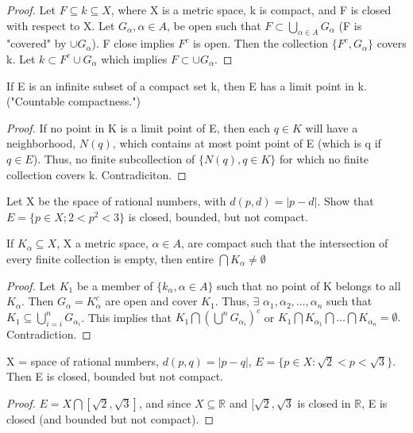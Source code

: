 \documentclass[11pt,fleqn]{book} %
\begin{document}
\begin{proof}
	Let $F \subseteq k \subseteq X$, where X is a metric space, k is compact, and F is closed with respect to X. Let $G_\alpha, \alpha \in A$, be open such that $F \subset \bigcup\limits_{\alpha \in A} G_\alpha$ (F is "covered" by $\cup G_\alpha$). F close implies $F^c$ is open. Then the collection $\{F^c, G_\alpha\}$ covers k. Let $k \subset F^c \cup G_\alpha$ which implies $F \subset \cup G_\alpha$. 
\end{proof}

\begin{theorem}
	If E is an infinite subset of a compact set k, then E has a limit point in k. ("Countable compactness.")
\end{theorem}

\begin{proof}
	If no point in K is a limit point of E, then each $q \in K$ will have a neighborhood, $N(q)$, which contains at most point point of E (which is q if $q \in E$). Thus, no finite subcollection of $\{N(q), q \in K \}$ for which no finite collection covers k. Contradiciton. 
\end{proof}

\begin{example}
	Let X be the space of rational numbers, with $d(p,d) = |p-d|$. Show that $E=\{p\in X; 2<p^2<3\}$ is closed, bounded, but not compact.
\end{example}

\begin{theorem}
	If $K_\alpha \subseteq X$, X a metric space, $\alpha \in A$, are compact such that the intersection of every finite collection is empty, then entire $\bigcap K_\alpha \neq \emptyset$ 
\end{theorem}

\begin{proof}
	Let $K_1$ be a member of $\{k_{\alpha}, \alpha \in A \}$ such that no point of K belongs to all $K_\alpha$. Then $G_\alpha = K_\alpha^c$ are open and cover $K_1$. Thus, $\exists$ $\alpha_1, \alpha_2, \dots, \alpha_n$ such that $K_1 \subseteq \bigcup\limits_{i=i}^n G_{\alpha_i}$. This implies that $K_1 \bigcap (\bigcup^n G_{\alpha_i})^c$ or $K_1 \bigcap K_{\alpha_1} \bigcap \dots \bigcap K_{\alpha_n} = \emptyset.$ Contradiction. 
\end{proof}

\begin{example}
	X = space of rational numbers, $d(p,q) = |p-q|$, $E= \{p \in X: \sqrt{2} < p < \sqrt{3}\}$. Then E is closed, bounded but not compact. 
	\begin{proof}
	 	$E = X \bigcap [\sqrt{2}, \sqrt{3}]$, and since $X \subseteq \mathbb{R}$ and $[\sqrt{2}, \sqrt{3}$ is closed in $\mathbb{R}$, E is closed (and bounded but not compact).
	 \end{proof} 
\end{example}
\end{document}
